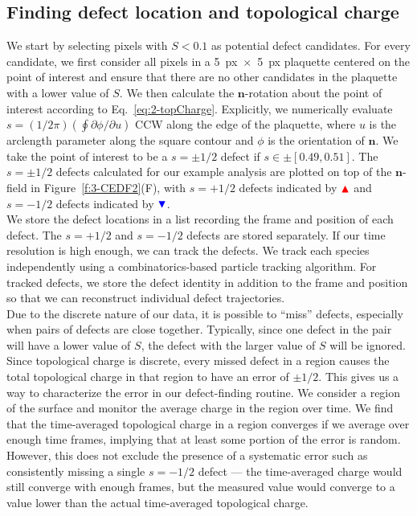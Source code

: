 \subsection{Finding defect location and topological charge}
We start by selecting pixels with $S < 0.1$ as potential defect candidates.
For every candidate, we first consider all pixels in a 5~px~$\times$~5~px plaquette centered on the point of interest and ensure that there are no other candidates in the plaquette with a lower value of $S$.
We then calculate the $\mathbf{n}$-rotation about the point of interest according to Eq.~\ref{eq:2-topCharge}.
Explicitly, we numerically evaluate $s = (1 / 2 \pi)(\oint \partial\phi / \partial u)$ CCW along the edge of the plaquette, where $u$ is the arclength parameter along the square contour and $\phi$ is the orientation of $\mathbf{n}$.
We take the point of interest to be a $s = \pm 1/2$ defect if $s \in \pm [0.49,0.51]$.
The $s=\pm1/2$ defects calculated for our example analysis are plotted on top of the $\mathbf{n}$-field in Figure~\ref{f:3-CEDF2}(F), with $s = +1/2$ defects indicated by ${\color{red} \blacktriangle } $  and $s = -1/2$ defects indicated by ${ \color{blue} \blacktriangledown } $.\\

We store the defect locations in a list recording the frame and position of each defect.
The $s = +1/2$ and $s = -1/2$ defects are stored separately.
If our time resolution is high enough, we can track the defects.
We track each species independently using a combinatorics-based particle tracking algorithm.
For tracked defects, we store the defect identity in addition to the frame and position so that we can reconstruct individual defect trajectories.\\

Due to the discrete nature of our data, it is possible to ``miss'' defects, especially when pairs of defects are close together.
Typically, since one defect in the pair will have a lower value of $S$, the defect with the larger value of $S$ will be ignored.
Since topological charge is discrete, every missed defect in a region causes the total topological charge in that region to have an error of $\pm 1/2$.
This gives us a way to characterize the error in our defect-finding routine.
We consider a region of the surface and monitor the average charge in the region over time.
We find that the time-averaged topological charge in a region converges if we average over enough time frames, implying that at least some portion of the error is random.
However, this does not exclude the presence of a systematic error such as consistently missing a single $s = -1/2$ defect --- the time-averaged charge would still converge with enough frames, but the measured value would converge to a value lower than the actual time-averaged topological charge.\\

